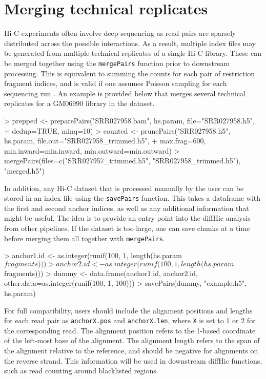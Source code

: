 \documentclass[12pt]{report}
\renewenvironment{Schunk}{\vspace{0pt}}{\vspace{0pt}}
\newcommand{\pkgname}{diffHic}
\newcommand{\code}[1]{{\small\texttt{#1}}}
\begin{document}
\section{Merging technical replicates}
Hi-C experiments often involve deep sequencing as read pairs are sparsely distributed across the possible interactions.
As a result, multiple index files may be generated from multiple technical replicates of a single Hi-C library.
These can be merged together using the \code{mergePairs} function prior to downstream processing.
This is equivalent to summing the counts for each pair of restriction fragment indices, and is valid if one assumes Poisson sampling for each sequencing run \citep{marioni2008rnaseq}.
An example is provided below that merges several technical replicates for a GM06990 library in the \citeauthor{lieberman2009comprehensive} dataset.

\begin{Schunk}
\begin{Sinput}
> prepped <- preparePairs("SRR027958.bam", hs.param, file="SRR027958.h5", 
+     dedup=TRUE, minq=10)
> counted <- prunePairs("SRR027958.h5", hs.param, file.out="SRR027958_trimmed.h5", 
+     max.frag=600, min.inward=min.inward, min.outward=min.outward)
> mergePairs(files=c("SRR027957_trimmed.h5", "SRR027958_trimmed.h5"), "merged.h5")
\end{Sinput}
\end{Schunk}

In addition, any Hi-C dataset that is processed manually by the user can be stored in an index file using the \code{savePairs} function.
This takes a dataframe with the first and second anchor indices, as well as any additional information that might be useful.
The idea is to provide an entry point into the \pkgname{} analysis from other pipelines.
If the dataset is too large, one can save chunks at a time before merging them all together with \code{mergePairs}.

\begin{Schunk}
\begin{Sinput}
> anchor1.id <- as.integer(runif(100, 1, length(hs.param$fragments)))
> anchor2.id <- as.integer(runif(100, 1, length(hs.param$fragments)))
> dummy <- data.frame(anchor1.id, anchor2.id, other.data=as.integer(runif(100, 1, 100)))
> savePairs(dummy, "example.h5", hs.param)
\end{Sinput}
\end{Schunk}

For full compatibility, users should include the alignment positions and lengths for each read pair as \code{anchorX.pos} and \code{anchorX.len},
    where \code{X} is set to 1 or 2 for the corresponding read.
The alignment position refers to the 1-based coordinate of the left-most base of the alignment.
The alignment length refers to the span of the alignment relative to the reference, and should be negative for alignments on the reverse strand.
This information will be used in downstream \pkgname{} functions, such as read counting around blacklisted regions.
\end{document}
